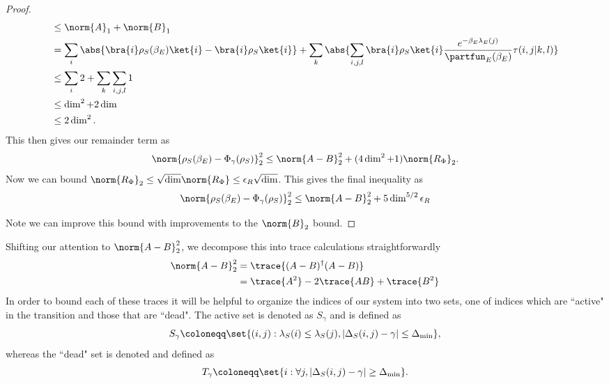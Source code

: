 \begin{proof}
\begin{align}
        &\leq \norm{A}_1 + \norm{B}_1 \\
        &= \sum_{i} \abs{\bra{i}\rho_S(\beta_E) \ket{i} - \bra{i} \rho_S \ket{i}} + \sum_k \abs{\sum_{i,j,l} \bra{i} \rho_S \ket{i} \frac{e^{-\beta_E \lambda_E(j)}}{\partfun_E(\beta_E)} \tau(i,j | k,l)} \\
        &\leq \sum_i 2 + \sum_k \sum_{i,j,l} 1 \\
        &\leq \dim^2 + 2 \dim \\
        &\leq 2 \dim^2.
    \end{align}
    This then gives our remainder term as
    \begin{equation}
        \norm{\rho_S(\beta_E) - \Phi_{\gamma}(\rho_S)}_2^2 \leq \norm{A - B}_2^2 + (4 \dim^2 + 1) \norm{R_{\Phi}}_2.
    \end{equation}
    Now we can bound $\norm{R_{\Phi}}_2 \leq \sqrt{\dim} \norm{R_{\Phi}} \leq \epsilon_{R} \sqrt{\dim}$. This gives the final inequality as
    \begin{equation}
        \norm{\rho_S(\beta_E) - \Phi_{\gamma}(\rho_S)}_2^2 \leq \norm{A - B}_2^2 + 5 \dim^{5/2} \epsilon_{R}
    \end{equation}
    
    Note we can improve this bound with improvements to the $\norm{B}_2$ bound. 
    \end{proof}
    
    
    Shifting our attention to $\norm{A-B}_2^2$, we decompose this into trace calculations straightforwardly
    \begin{align}
        \norm{A-B}_2^2 &= \trace{(A-B)^\dagger (A-B)} \\
        &= \trace{A^2} - 2 \trace{AB} + \trace{B^2}
    \end{align}
    In order to bound each of these traces it will be helpful to organize the indices of our system into two sets, one of indices which are ``active" in the transition and those that are ``dead". The active set is denoted as $S_{\gamma}$ and is defined as
    \begin{equation}
        S_{\gamma} \coloneqq \set{(i,j) : \lambda_S(i) \leq \lambda_S(j), |\Delta_S(i,j) - \gamma| \leq \Delta_{\min}},
    \end{equation}
    whereas the ``dead" set is denoted and defined as
    \begin{equation}
    T_{\gamma} \coloneqq \set{i : \forall j, |\Delta_S(i,j) - \gamma| \geq \Delta_{\min}}. 
    \end{equation}
    
